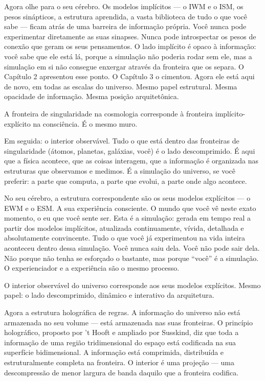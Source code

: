 \documentclass[11pt, twoside, openright]{book}
\begin{document}
Agora olhe para o seu cérebro. Os modelos implícitos --- o IWM e o ISM, os pesos sinápticos, a estrutura aprendida, a vasta biblioteca de tudo o que você sabe --- ficam atrás de uma barreira de informação própria. Você nunca pode experimentar diretamente as suas sinapses. Nunca pode introspectar os pesos de conexão que geram os seus pensamentos. O lado implícito é opaco à informação: você sabe que ele está lá, porque a simulação não poderia rodar sem ele, mas a simulação em si não consegue enxergar através da fronteira que os separa. O Capítulo 2 apresentou esse ponto. O Capítulo 3 o cimentou. Agora ele está aqui de novo, em todas as escalas do universo. Mesmo papel estrutural. Mesma opacidade de informação. Mesma posição arquitetônica.

A fronteira de singularidade na cosmologia corresponde à fronteira implícito-explícito na consciência. É o mesmo muro.

Em seguida: o interior observável. Tudo o que está dentro das fronteiras de singularidade (átomos, planetas, galáxias, você) é o lado descomprimido. É aqui que a física acontece, que as coisas interagem, que a informação é organizada nas estruturas que observamos e medimos. É a simulação do universo, se você preferir: a parte que computa, a parte que evolui, a parte onde algo acontece.

No seu cérebro, a estrutura correspondente são os seus modelos explícitos --- o EWM e o ESM. A sua experiência consciente. O mundo que você vê neste exato momento, o eu que você sente ser. Esta é a simulação: gerada em tempo real a partir dos modelos implícitos, atualizada continuamente, vívida, detalhada e absolutamente convincente. Tudo o que você já experimentou na vida inteira aconteceu dentro dessa simulação. Você nunca saiu dela. Você não pode sair dela. Não porque não tenha se esforçado o bastante, mas porque ``você'' é a simulação. O experienciador e a experiência são o mesmo processo.

O interior observável do universo corresponde aos seus modelos explícitos. Mesmo papel: o lado descomprimido, dinâmico e interativo da arquitetura.

Agora a estrutura holográfica de regras. A informação do universo não está armazenada no seu volume --- está armazenada nas suas fronteiras. O princípio holográfico, proposto por 't Hooft e ampliado por Susskind, diz que toda a informação de uma região tridimensional do espaço está codificada na sua superfície bidimensional. A informação está comprimida, distribuída e estruturalmente completa na fronteira. O interior é uma projeção --- uma descompressão de menor largura de banda daquilo que a fronteira codifica.
\end{document}
